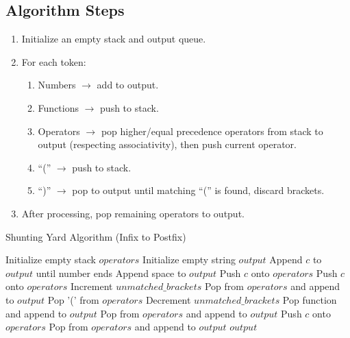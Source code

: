 \documentclass[conference]{IEEEtran}
\begin{document}
\subsection{Algorithm Steps}
\begin{enumerate}
    \item Initialize an empty stack and output queue.
    \item For each token:
    \begin{enumerate}
        \item Numbers $\rightarrow$ add to output.
        \item Functions $\rightarrow$ push to stack.
        \item Operators $\rightarrow$ pop higher/equal precedence operators from stack to output (respecting associativity), then push current operator.
        \item ``('' $\rightarrow$ push to stack.
        \item ``)'' $\rightarrow$ pop to output until matching ``('' is found, discard brackets.
    \end{enumerate}
    \item After processing, pop remaining operators to output.
\end{enumerate}

\begin{algorithm}
\caption{Shunting Yard Algorithm (Infix to Postfix)}
\begin{algorithmic}[1]
    \State Initialize empty stack $operators$
    \State Initialize empty string $output$
            \State Append $c$ to $output$ until number ends
            \State Append space to $output$
            \State Push $c$ onto $operators$
            \State Push $c$ onto $operators$
            \State Increment $unmatched\_brackets$
                \State Pop from $operators$ and append to $output$
            \EndWhile
            \State Pop '(' from $operators$
            \State Decrement $unmatched\_brackets$
                \State Pop function and append to $output$
            \EndIf
                \State Pop from $operators$ and append to $output$
            \EndWhile
            \State Push $c$ onto $operators$
        \EndIf
    \EndFor
        \State Pop from $operators$ and append to $output$
    \EndWhile
    \State \Return $output$
\EndFunction
\end{algorithmic}
\end{algorithm}
\end{document}
